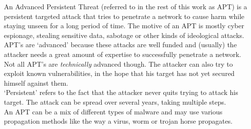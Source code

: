 An Advanced Persistent Threat (referred to in the rest of this work as APT) is a persistent targeted attack that tries to penetrate a network to cause harm while staying unseen for a long period of time. The motive of an APT is mostly cyber espionage, stealing sensitive data, sabotage or other kinds of ideological attacks. APT's are `advanced' because these attacks are well funded and (usually) the attacker needs a great amount of expertise to successfully penetrate a network. Not all APT's are \textit{technically} advanced though. The attacker can also try to exploit known vulnerabilities, in the hope that his target has not yet secured himself against them. \\
`Persistent' refers to the fact that the attacker never quits trying to attack his target. The attack can be spread over several years, taking multiple steps.  \\
An APT can be a mix of different types of malware and may use various propagation methods like the way a virus, worm or trojan horse propagates. \\
%
%
%
%
%

